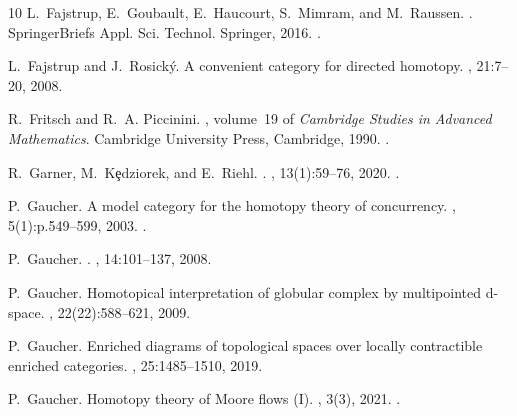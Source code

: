 \documentclass[a4paper,12pt]{amsart}
\theoremstyle{definition}
\begin{document}
\begin{thebibliography}{10}
	L.~Fajstrup, E.~Goubault, E.~Haucourt, S.~Mimram, and M.~Raussen.
	.
	\newblock SpringerBriefs Appl. Sci. Technol. Springer, 2016.
	\newblock \href {https://doi.org/10.1007/978-3-319-15398-8}
	{}.
	
	L.~Fajstrup and J.~Rosick{\'y}.
	\newblock A convenient category for directed homotopy.
	, 21:7--20, 2008.
	
	R.~Fritsch and R.~A. Piccinini.
	, volume~19 of {\em Cambridge
		Studies in Advanced Mathematics}.
	\newblock Cambridge University Press, Cambridge, 1990.
	\newblock \href {https://doi.org/10.1017/cbo9780511983948}
	{}.
	
	R.~Garner, M.~{K\c{e}dziorek}, and E.~Riehl.
	.
	, 13(1):59--76, 2020.
	\newblock \href {https://doi.org/10.1112/topo.12123}
	{}.
	
	P.~Gaucher.
	\newblock A model category for the homotopy theory of concurrency.
	, 5(1):p.549--599, 2003.
	\newblock \href {https://doi.org/10.4310/hha.2003.v5.n1.a20}
	{}.
	
	P.~{Gaucher}.
	.
	, 14:101--137, 2008.
	
	P.~Gaucher.
	\newblock Homotopical interpretation of globular complex by multipointed
	d-space.
	, 22(22):588--621, 2009.
	
	P.~Gaucher.
	\newblock Enriched diagrams of topological spaces over locally contractible
	enriched categories.
	, 25:1485--1510, 2019.
	
	P.~Gaucher.
	\newblock Homotopy theory of {M}oore flows ({I}).
	, 3(3), 2021.
	\newblock \href {https://doi.org/10.32408/compositionality-3-3}
	{}.
	

\end{thebibliography}
\end{document}
